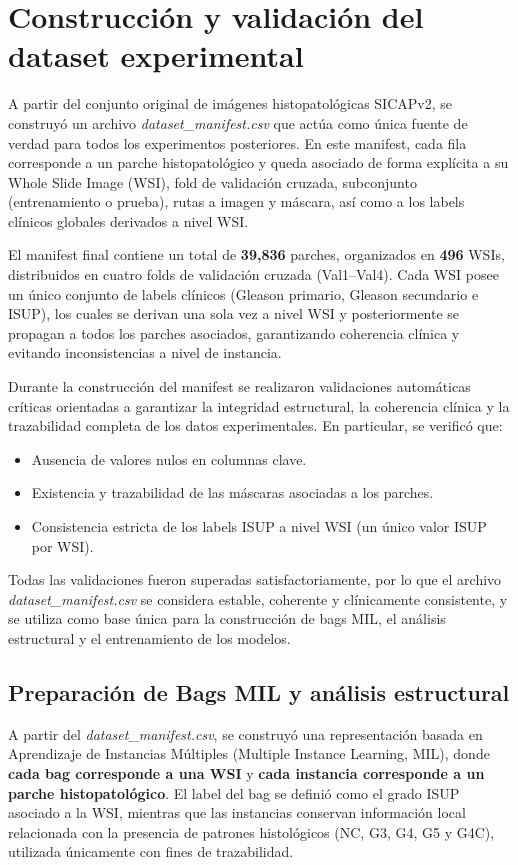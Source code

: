
\section{Construcción y validación del dataset experimental}
A partir del conjunto original de imágenes histopatológicas SICAPv2, se construyó un archivo \textit{dataset\_manifest.csv} que actúa como única fuente de verdad para todos los experimentos posteriores. En este manifest, cada fila corresponde a un parche histopatológico y queda asociado de forma explícita a su Whole Slide Image (WSI), fold de validación cruzada, subconjunto (entrenamiento o prueba), rutas a imagen y máscara, así como a los labels clínicos globales derivados a nivel WSI.\newline

El manifest final contiene un total de \textbf{39,836} parches, organizados en \textbf{496} WSIs, distribuidos en cuatro folds de validación cruzada (Val1--Val4). Cada WSI posee un único conjunto de labels clínicos (Gleason primario, Gleason secundario e ISUP), los cuales se derivan una sola vez a nivel WSI y posteriormente se propagan a todos los parches asociados, garantizando coherencia clínica y evitando inconsistencias a nivel de instancia.\newline

Durante la construcción del manifest se realizaron validaciones automáticas críticas orientadas a garantizar la integridad estructural, la coherencia clínica y la trazabilidad completa de los datos experimentales. En particular, se verificó que:

\begin{itemize}
    \item Ausencia de valores nulos en columnas clave.
    \item Existencia y trazabilidad de las máscaras asociadas a los parches.
    \item Consistencia estricta de los labels ISUP a nivel WSI (un único valor ISUP por WSI).
\end{itemize}

Todas las validaciones fueron superadas satisfactoriamente, por lo que el archivo \textit{dataset\_manifest.csv} se considera estable, coherente y clínicamente consistente, y se utiliza como base única para la construcción de bags MIL, el análisis estructural y el entrenamiento de los modelos.

\subsection{Preparación de Bags MIL y análisis estructural}
A partir del \textit{dataset\_manifest.csv}, se construyó una representación basada en Aprendizaje de Instancias Múltiples (Multiple Instance Learning, MIL), donde \textbf{cada bag corresponde a una WSI} y \textbf{cada instancia corresponde a un parche histopatológico}. El label del bag se definió como el grado ISUP asociado a la WSI, mientras que las instancias conservan información local relacionada con la presencia de patrones histológicos (NC, G3, G4, G5 y G4C), utilizada únicamente con fines de trazabilidad.\newline

